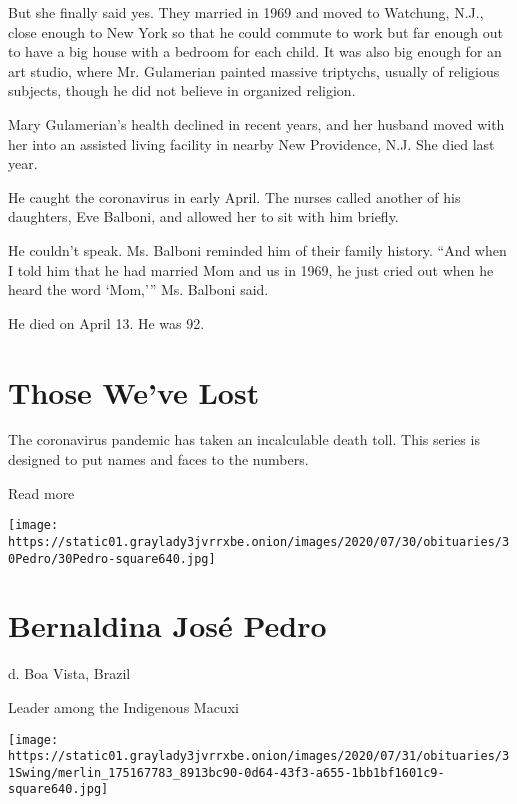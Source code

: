 But she finally said yes. They married in 1969 and moved to Watchung,
N.J., close enough to New York so that he could commute to work but far
enough out to have a big house with a bedroom for each child. It was
also big enough for an art studio, where Mr. Gulamerian painted massive
triptychs, usually of religious subjects, though he did not believe in
organized religion.

Mary Gulamerian's health declined in recent years, and her husband moved
with her into an assisted living facility in nearby New Providence, N.J.
She died last year.

He caught the coronavirus in early April. The nurses called another of
his daughters, Eve Balboni, and allowed her to sit with him briefly.

He couldn't speak. Ms. Balboni reminded him of their family history.
``And when I told him that he had married Mom and us in 1969, he just
cried out when he heard the word `Mom,''' Ms. Balboni said.

He died on April 13. He was 92.

\href{https://www.nytimes3xbfgragh.onion/interactive/2020/obituaries/people-died-coronavirus-obituaries.html?action=click\&pgtype=Article\&state=default\&region=BELOW_MAIN_CONTENT\&context=covid_obits_promo}{}

\hypertarget{those-weve-lost}{%
\section{Those We've Lost}\label{those-weve-lost}}

The coronavirus pandemic has taken an incalculable death toll. This
series is designed to put names and faces to the numbers.

Read more

\texttt{[image: https://static01.graylady3jvrrxbe.onion/images/2020/07/30/obituaries/30Pedro/30Pedro-square640.jpg]}

\hypertarget{bernaldina-josuxe9-pedro}{%
\section{Bernaldina José Pedro}\label{bernaldina-josuxe9-pedro}}

d. Boa Vista, Brazil

Leader among the Indigenous Macuxi

\texttt{[image: https://static01.graylady3jvrrxbe.onion/images/2020/07/31/obituaries/31Swing/merlin\_175167783\_8913bc90-0d64-43f3-a655-1bb1bf1601c9-square640.jpg]}


